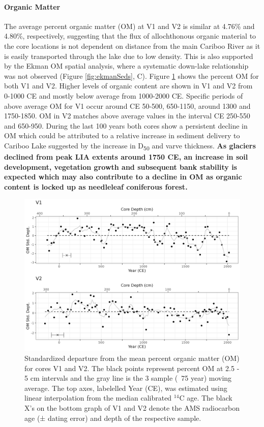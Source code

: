 \documentclass[Royal,times,doublespace,sageh]{sagej}
\begin{document}
\hypertarget{organic-matter}{%
\paragraph{Organic Matter}\label{organic-matter}}

The average percent organic matter (OM) at V1 and V2 is similar at
4.76\% and 4.80\%, respectively, suggesting that the flux of
allochthonous organic material to the core locations is not dependent on
distance from the main Cariboo River as it is easily transported through
the lake due to low density. This is also supported by the Ekman OM
spatial analysis, where a systematic down-lake relationship was not
observed (Figure \ref{fig:ekmanSeds}, C). Figure \ref{fig:loi} shows the
percent OM for both V1 and V2. Higher levels of organic content are
shown in V1 and V2 from 0-1000 CE and mostly below average from
1000-2000 CE. Specific periods of above average OM for V1 occur around
CE 50-500, 650-1150, around 1300 and 1750-1850. OM in V2 matches above
average values in the interval CE 250-550 and 650-950. During the last
100 years both cores show a persistent decline in OM which could be
attributed to a relative increase in sediment delivery to Cariboo Lake
suggested by the increase in D\textsubscript{50} and varve thickness.
\textbf{As glaciers declined from peak LIA extents around 1750 CE, an
increase in soil development, vegetation growth and subsequent bank
stability is expected which may also contribute to a decline in OM as
organic content is locked up as needleleaf coniferous forest.}

\begin{figure}

{\centering \includegraphics[width=1\linewidth]{figs/V1_V2_LOI_vs_depth_and_C14_est_yr} 

}

\caption{Standardized departure from the mean percent organic matter (OM) for cores V1 and V2. The black points represent percent OM at 2.5 - 5 cm intervals and the gray line is the 3 sample (~75 year) moving average. The top axes, labelelled Year (CE), was estimated using linear interpolation from the median calibrated $^{14}$C age. The black X's on the bottom graph of V1 and V2 denote the AMS radiocarbon age (± dating error) and depth of the respective sample.\label{loi}}\label{fig:loi}
\end{figure}
\end{document}
